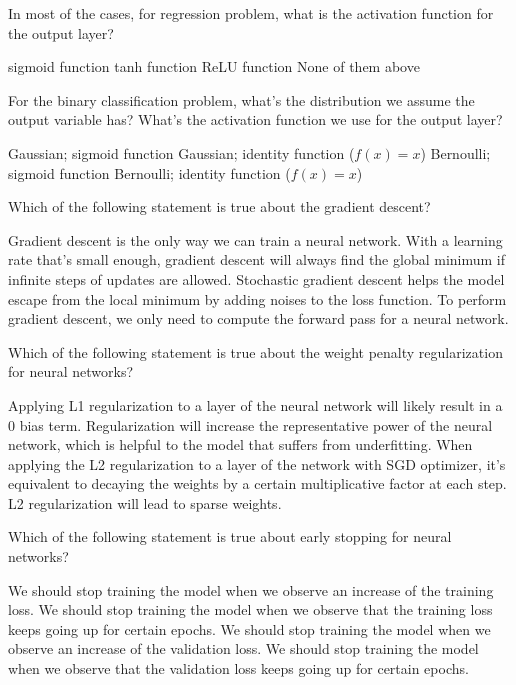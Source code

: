 \begin{questions}
    \question[2] In most of the cases, for regression problem, what is the activation function for the output layer?
    \begin{checkboxes}
        \choice sigmoid function
        \choice tanh function
        \choice ReLU function
        \choice None of them above
    \end{checkboxes}
    
    \question[2] For the binary classification problem, what's the distribution we assume the output variable has? What's the activation function we use for the output layer?
    \begin{checkboxes}
        \choice Gaussian; sigmoid function
        \choice Gaussian; identity function ($f(x)=x$)
        \choice Bernoulli; sigmoid function
        \choice Bernoulli; identity function ($f(x)=x$)
    \end{checkboxes}
    
    \question[2] Which of the following statement is true about the gradient descent?
    \begin{checkboxes}
        \choice Gradient descent is the only way we can train a neural network.
        \choice With a learning rate that's small enough, gradient descent will always find the global minimum if infinite steps of updates are allowed.
        \choice Stochastic gradient descent helps the model escape from the local minimum by adding noises to the loss function. 
        \choice To perform gradient descent, we only need to compute the forward pass for a neural network.
    \end{checkboxes}
    
    \question[2] Which of the following statement is true about the weight penalty regularization for neural networks?
    \begin{checkboxes}
        \choice Applying L1 regularization to a layer of the neural network will likely result in a 0 bias term.
        \choice Regularization will increase the representative power of the neural network, which is helpful to the model that suffers from underfitting.
        \choice When applying the L2 regularization to a layer of the network with SGD optimizer, it's equivalent to decaying the weights by a certain multiplicative factor at each step. 
        \choice L2 regularization will lead to sparse weights.
    \end{checkboxes}
    
    \question[2] Which of the following statement is true about early stopping for neural networks?
    \begin{checkboxes}
        \choice We should stop training the model when we observe an increase of the training loss. 
        \choice We should stop training the model when we observe that the training loss keeps going up for certain epochs.
        \choice We should stop training the model when we observe an increase of the validation loss. 
        \choice We should stop training the model when we observe that the validation loss keeps going up for certain epochs.
    \end{checkboxes}
    

\end{questions}
